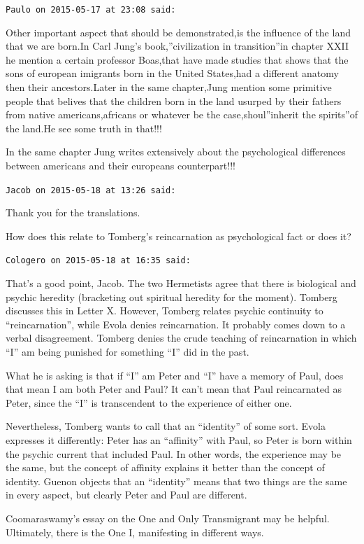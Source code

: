 \begin{footnotesize}
\begin{sffamily}
\texttt{Paulo on 2015-05-17 at 23:08 said:}

Other important aspect that should be demonstrated,is the influence of the land that we are born.In Carl Jung's book,''civilization in transition''in chapter XXII he mention a certain professor Boas,that have made studies that shows that the sons of european imigrants born in the United States,had a different anatomy then their ancestors.Later in the same chapter,Jung mention some primitive people that belives that the children born in the land usurped by their fathers from native americans,africans or whatever be the case,shoul''inherit the spirits''of the land.He see some truth in that!!!

In the same chapter Jung writes extensively about the psychological differences between americans and their europeans counterpart!!!

\hfill

\texttt{Jacob on 2015-05-18 at 13:26 said:}

Thank you for the translations.

How does this relate to Tomberg's reincarnation as psychological fact or does it?

\hfill

\texttt{Cologero on 2015-05-18 at 16:35 said:}

That's a good point, Jacob. The two Hermetists agree that there is biological and psychic heredity (bracketing out spiritual heredity for the moment). Tomberg discusses this in Letter X. However, Tomberg relates psychic continuity to ``reincarnation'', while Evola denies reincarnation. It probably comes down to a verbal disagreement. Tomberg denies the crude teaching of reincarnation in which ``I'' am being punished for something ``I'' did in the past.

What he is asking is that if ``I'' am Peter and ``I'' have a memory of Paul, does that mean I am both Peter and Paul? It can't mean that Paul reincarnated as Peter, since the ``I'' is transcendent to the experience of either one.

Nevertheless, Tomberg wants to call that an ``identity'' of some sort. Evola expresses it differently: Peter has an ``affinity'' with Paul, so Peter is born within the psychic current that included Paul. In other words, the experience may be the same, but the concept of affinity explains it better than the concept of identity. Guenon objects that an ``identity'' means that two things are the same in every aspect, but clearly Peter and Paul are different.

Coomaraswamy's essay on the One and Only Transmigrant may be helpful. Ultimately, there is the One I, manifesting in different ways.

\end{sffamily}
\end{footnotesize}

